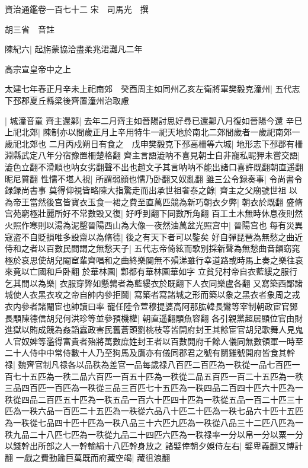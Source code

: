資治通鑑卷一百七十二
宋　司馬光　撰

胡三省　音註

陳紀六|{
	起旃蒙協洽盡柔兆涒灘凡二年}


高宗宣皇帝中之上

太建七年春正月辛未上祀南郊　癸酉周主如同州乙亥左衛將軍樊毅克潼州|{
	五代志下邳郡夏丘縣梁後齊置潼州治取慮}


|{
	城潼音童}
齊主還鄴|{
	去年二月齊主如晉陽討思好尋已還鄴八月復如晉陽今還}
辛巳上祀北郊|{
	陳制亦以間歲正月上辛用特牛一祀天地於南北二郊間歲者一歲祀南郊一歲祀北郊也}
二月丙戍朔日有食之　戊申樊毅克下邳高柵等六城|{
	地形志下邳郡有柵淵縣武定八年分宿豫置柵楚格翻}
齊主言語澁呐不喜見朝士自非寵私昵狎未嘗交語|{
	澁色立翻不滑順也呐女劣翻聲不出也趙文子其言呐呐不能出諸口喜許既翻朝直遥翻昵尼質翻}
性懦不堪人視|{
	所謂弱顔也懦乃卧翻又奴亂翻}
雖三公令録奏事|{
	令尚書令録録尚書事}
莫得仰視皆略陳大指驚走而出承世祖奢泰之餘|{
	齊主之父廟號世祖}
以為帝王當然後宫皆寶衣玉食一裙之費至直萬匹競為新巧朝衣夕弊|{
	朝衣於既翻}
盛脩宫苑窮極壯麗所好不常數毁又復|{
	好呼到翻下同數所角翻}
百工土木無時休息夜則然火照作寒則以湯為泥鑿晉陽西山為大像一夜然油萬盆光照宫中|{
	晉陽宫也}
每有災異寇盗不自貶損唯多設齋以為脩德|{
	後之有天下者可以鍳矣}
好自彈琵琶為無愁之曲近侍和之者以百數民間謂之無愁天子|{
	五代志帝倚絃而歌别採新聲為無愁曲音韻窈窕極於哀思使胡兒閹䆠輩齊唱和之曲終樂闋無不殞涕雖行幸道路或時馬上奏之樂往哀來竟以亡國和戶卧翻}
於華林園|{
	鄴都有華林園華如字}
立貧兒村帝自衣藍縷之服行乞其間以為樂|{
	衣服穿弊如懸鶉者為藍縷衣於既翻下人衣同樂盧各翻}
又寫築西鄙諸城使人衣黑衣攻之帝自帥内參拒鬬|{
	寫築者寫諸城之形而築以象之黑衣者象周之戎衣内參者諸閹宦也帥讀曰率}
寵任陸令萱穆提婆高阿那肱韓長鸞等宰制朝政宦官鄧長顒陳德信胡兒何洪珍等並參預機權|{
	朝直遥翻顒魚容翻}
各引親黨超居顯位官由財進獄以賄成競為姦謟蠧政害民舊蒼頭劉桃枝等皆開府封王其餘宦官胡兒歌舞人見鬼人官奴婢等濫得富貴者殆將萬數庶姓封王者以百數開府千餘人儀同無數領軍一時至二十人侍中中常侍數十人乃至狗馬及鷹亦有儀同郡君之號有鬬雞號開府皆食其幹禄|{
	魏齊官制凡禄各以品秩為差官一品每歲禄八百匹二百匹為一秩從一品七百匹一百七十五匹為一秩二品六百匹一百五十匹為一秩從二品五百匹一百二十五匹為一秩三品四百匹一百匹為一秩從三品三百匹七十五匹為一秩四品二百四十匹六十匹為一秩從四品二百匹五十匹為一秩五品一百六十匹四十匹為一秩從五品一百二十匹三十匹為一秩六品一百匹二十五匹為一秩從六品八十匹二十匹為一秩七品六十匹十五匹為一秩從七品四十匹十匹為一秩八品三十六匹九匹為一秩從八品三十二匹八匹為一秩九品二十八匹七匹為一秩從九品二十四匹六匹為一秩禄率一分以帛一分以粟一分以錢幹出所部之人一幹輸絹十八匹幹身放之}
諸嬖倖朝夕娛侍左右|{
	嬖卑義翻又博計翻}
一戱之費動踰巨萬既而府藏空竭|{
	藏徂浪翻}

